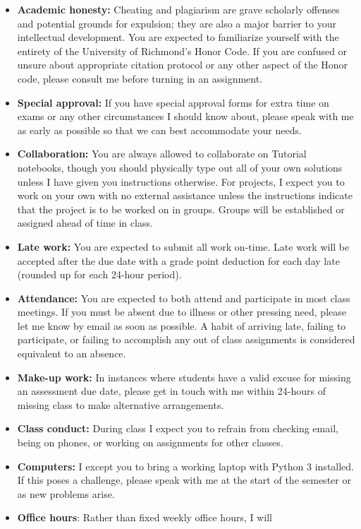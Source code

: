 \documentclass[12pt]{article}
\begin{document}
\begin{itemize}\setlength\itemsep{0em}
\item \textbf{Academic honesty:} Cheating and plagiarism are grave scholarly
offenses and potential grounds
for expulsion; they are also a major barrier to your intellectual development.
You are expected to familiarize yourself with the entirety of the
University of Richmond’s Honor Code. If you are confused or unsure about
appropriate citation protocol or any other aspect of the Honor code,
please consult me before turning in an assignment.
\item \textbf{Special approval:} If you have special approval forms for extra
time on exams or any other circumstances I should know about, please speak
with me as early as possible so that we can best accommodate your needs.
\item \textbf{Collaboration:} You are always allowed to collaborate on Tutorial
notebooks, though you should physically type out all of your own solutions
unless I have given you instructions otherwise. For projects, I expect you to
work on your own with no external assistance unless the instructions indicate
that the project is to be worked on in groups. Groups will be established or
assigned ahead of time in class.
\item \textbf{Late work:} You are expected to submit all work on-time. Late
work will be accepted after the due date with a grade point deduction for each day
late (rounded up for each 24-hour period).
\item \textbf{Attendance:} You are expected to both attend and participate in most
class meetings. If you must be absent due to illness or other pressing
need, please let me know by email as soon as possible. A habit of arriving
late, failing to participate, or failing to accomplish any out of class assignments
is considered equivalent to an absence.
\item \textbf{Make-up work:} In instances where students have a valid excuse for
missing an assessment due date, please get in touch with me within 24-hours of
missing class to make alternative arrangements.
\item \textbf{Class conduct:} During class I expect you to refrain from checking
email, being on phones, or working on assignments for other classes.
\item \textbf{Computers:} I except you to bring a working laptop with Python
3 installed. If this poses a challenge, please speak with me at the
start of the semester or as new problems arise.
\item \textbf{Office hours}: Rather than fixed weekly office hours, I will

\end{itemize}
\end{document}
